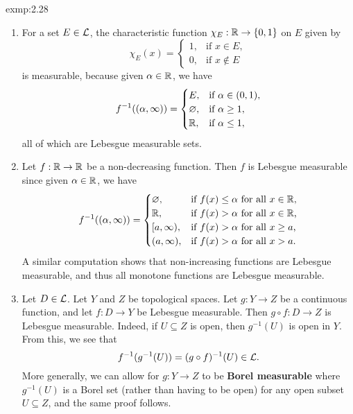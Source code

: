 \begin{exmp}{exmp:2.28}
    \begin{enumerate}[(1)]
        \item For a set $E \in {\cal L}$, the characteristic function 
        $\chi_E : \mathbb{R} \to \{0, 1\}$ on $E$ given by 
        \[ \chi_E(x) = \begin{cases}
            1, & \text{if } x \in E, \\ 
            0, & \text{if } x \notin E 
        \end{cases} \]
        is measurable, because given $\alpha \in \mathbb{R}$, we have 
        \[ f^{-1}((\alpha, \infty)) = \begin{cases}
            E, & \text{if } \alpha \in (0, 1), \\ 
            \varnothing, & \text{if } \alpha \geq 1, \\ 
            \mathbb{R}, & \text{if } \alpha \leq 1, 
        \end{cases} \] 
        all of which are Lebesgue measurable sets. 

        \item Let $f : \mathbb{R} \to \mathbb{R}$ be a non-decreasing function. 
        Then $f$ is Lebesgue measurable since given $\alpha \in \mathbb{R}$, we have 
        \[ f^{-1}((\alpha, \infty)) = \begin{cases}
            \varnothing, & \text{if $f(x) \leq \alpha$ for all $x \in \mathbb{R}$,} \\ 
            \mathbb{R}, & \text{if $f(x) > \alpha$ for all $x \in \mathbb{R}$,} \\ 
            [a, \infty), & \text{if $f(x) > \alpha$ for all $x \geq a$,} \\ 
            (a, \infty), & \text{if $f(x) > \alpha$ for all $x > a$.}
        \end{cases} \] 
        A similar computation shows that non-increasing functions are 
        Lebesgue measurable, and thus all monotone functions are Lebesgue 
        measurable. 

        \item Let $D \in {\cal L}$. Let $Y$ and $Z$ be topological spaces. 
        Let $g : Y \to Z$ be a continuous function, and let $f : D \to Y$ 
        be Lebesgue measurable. Then $g \circ f : D \to Z$ is Lebesgue 
        measurable. Indeed, if $U \subseteq Z$ is open, then 
        $g^{-1}(U)$ is open in $Y$. From this, we see that 
        \[ f^{-1}(g^{-1}(U)) = (g \circ f)^{-1}(U) \in {\cal L}. \] 
        More generally, we can allow for $g : Y \to Z$ to be {\bf Borel 
        measurable} where $g^{-1}(U)$ is a Borel set (rather than having 
        to be open) for any open subset $U \subseteq Z$, and the same proof 
        follows. 
    \end{enumerate}
\end{exmp}

